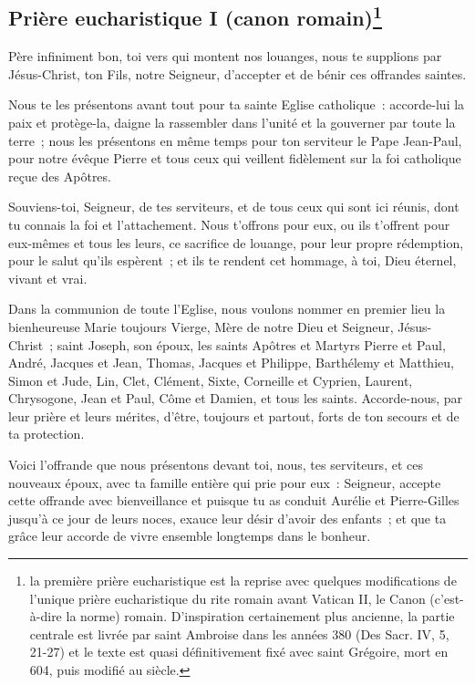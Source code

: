 \subsection*{Prière eucharistique I (canon romain)\footnote{la première prière eucharistique est la reprise avec quelques modifications de l’unique 
prière eucharistique du rite romain avant Vatican II, le Canon 
(c’est-à-dire la norme) romain. D'inspiration certainement plus ancienne,
la partie centrale est livrée par saint Ambroise dans les années 380 
(Des Sacr. IV, 5, 21-27) et le texte est quasi définitivement fixé avec
saint Grégoire, mort en 604, puis modifié au  siècle. }}\label{pe1} 







Père infiniment bon, toi vers qui montent nos louanges, nous te supplions
par Jésus-Christ, ton Fils, notre Seigneur,  d'accepter et de bénir 
ces offrandes saintes.

Nous te les présentons avant tout pour ta sainte Eglise catholique~:
accorde-lui la paix et protège-la, daigne la rassembler dans l'unité et la
gouverner par toute la terre~; nous les présentons en même temps pour ton
serviteur le Pape Jean-Paul, pour notre évêque Pierre et tous ceux
qui veillent fidèlement sur la foi catholique reçue des Apôtres.

Souviens-toi, Seigneur, de tes serviteurs, et de tous 
ceux qui sont ici réunis, dont tu connais la foi et l'attachement. Nous
t'offrons pour eux, ou ils t'offrent pour eux-mêmes et tous les leurs, ce
sacrifice de louange, pour leur propre rédemption, pour le salut qu'ils
espèrent~; et ils te rendent cet hommage, à toi, Dieu éternel, vivant et
vrai.

Dans la communion de toute l'Eglise, nous voulons nommer en premier lieu la
bienheureuse Marie toujours Vierge, Mère de notre Dieu et Seigneur,
Jésus-Christ~; saint Joseph, son époux, les saints Apôtres et Martyrs Pierre
et Paul, André, Jacques et Jean, Thomas, Jacques et Philippe, Barthélemy et
Matthieu, Simon et Jude, Lin, Clet, Clément, Sixte, Corneille et Cyprien,
Laurent, Chrysogone, Jean et Paul, Côme et Damien, et tous les saints.
Accorde-nous, par leur prière et leurs mérites, d'être, toujours et partout,
forts de ton secours et de ta protection.

Voici l'offrande que nous présentons devant toi, nous, tes serviteurs,
et ces nouveaux époux, avec ta famille entière qui prie pour eux~:
Seigneur, accepte cette offrande avec bienveillance et puisque tu as
conduit Aurélie et Pierre-Gilles jusqu'à ce jour de leurs noces,
exauce leur désir d'avoir des enfants~; et que ta grâce leur accorde
de vivre ensemble longtemps dans le bonheur.

